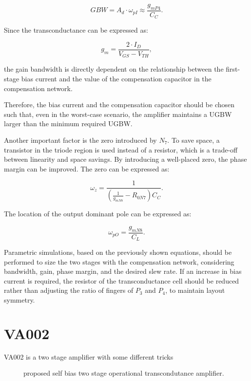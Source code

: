 \documentclass[12pt]{article}
\begin{document}
\begin{equation} GBW = A_d \cdot \omega_{pI} \approx \frac{g_{mP4}}{C_C}. \end{equation}

Since the transconductance can be expressed as:

\begin{equation} g_m = \frac{2 \cdot I_D}{V_{GS} - V_{TH}}, \end{equation}

the gain bandwidth is directly dependent on the relationship between the first-stage bias current and the value of the compensation capacitor in the compensation network. 

Therefore, the bias current and the compensation capacitor should be chosen such that, even in the worst-case scenario, the amplifier maintains a UGBW larger than the minimum required UGBW.

Another important factor is the zero introduced by $N_7$. To save space, a transistor in the triode region is used instead of a resistor, which is a trade-off between linearity and space savings. By introducing a well-placed zero, the phase margin can be improved. The zero can be expressed as:

\begin{equation} \omega_z = \frac{1}{\left(\frac{1}{g_{mN8}} - R_{0N7}\right)C_C}. \end{equation}

The location of the output dominant pole can be expressed as:

\begin{equation} \omega_{pO} = \frac{g_{mN8}}{C_L}. \end{equation}

Parametric simulations, based on the previously shown equations, should be performed to size the two stages with the compensation network, considering bandwidth, gain, phase margin, and the desired slew rate. If an increase in bias current is required, the resistor of the transconductance cell should be reduced rather than adjusting the ratio of fingers of $P_3$ and $P_4$, to maintain layout symmetry.



\section{VA002}
VA002 is a two stage amplifier with some different tricks
\begin{figure}[H]
        \centering
        
        \caption{proposed self bias two stage operational transcondutance amplifier.}
        \label{OP}
\end{figure}
\end{document}
